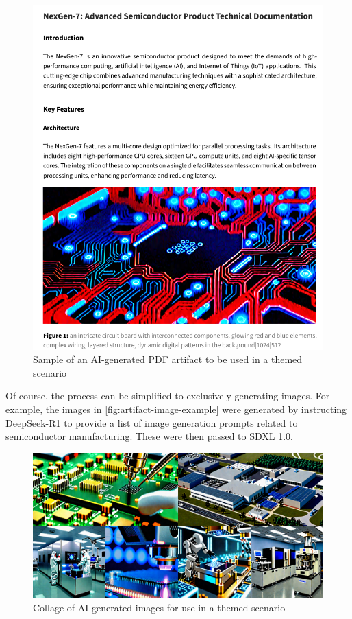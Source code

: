 \documentclass[letterpaper,12pt]{report}
\begin{document}
\begin{figure}[htbp]
\centering
\includegraphics[width=1\linewidth]{pdf-example.png}
\caption{Sample of an AI-generated PDF artifact to be used in a themed
scenario}\label{fig:artifact-document-example}
\end{figure}

Of course, the process can be simplified to exclusively generating
images. For example, the images in \autoref{fig:artifact-image-example}
were generated by instructing DeepSeek-R1 to provide a list of image
generation prompts related to semiconductor manufacturing. These were
then passed to SDXL 1.0.

\begin{figure}[htbp]
\centering
\includegraphics[width=1\linewidth]{collage.png}
\caption{Collage of AI-generated images for use in a themed
scenario}\label{fig:artifact-image-example}
\end{figure}
\end{document}
